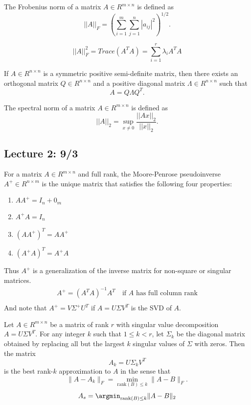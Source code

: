 \documentclass[answers,12pt,addpoints]{exam}
\begin{document}
\begin{example}
     The Frobenius norm of a matrix $A \in R^{m \times n}$ is defined as
    $$||A||_F = \left( \sum_{i=1}^{m} \sum_{j=1}^{n} |a_{ij}|^2 \right)^{1/2}.$$
    \begin{remark}
$$||A||_F^2 = Trace(A^TA) = \sum_{i=1}^{r} \lambda_i A^T A$$
    \end{remark}
\end{example}
\begin{theorem}
     If $A \in R^{n \times n}$ is a symmetric positive semi-definite matrix, then there exists an orthogonal matrix $Q \in R^{n \times n}$ and a positive diagonal matrix $\Lambda \in R^{n \times n}$ such that
    $$A = Q \Lambda Q^T.$$
\end{theorem}
\begin{definition}
    The spectral norm of a matrix $A \in R^{m \times n}$ is defined as
    $$||A||_2 = \sup_{x \neq 0} \frac{||Ax||_2}{||x||_2}.$$
\end{definition}

\subsection{Lecture 2: 9/3}
\begin{definition}
     For a matrix $A \in R^{m \times n}$ and full rank, the Moore-Penrose pseudoinverse $A^+ \in R^{n \times m}$ is the unique matrix that satisfies the following four properties:
    \begin{enumerate}
        \item $AA^+ = I_n + 0_m$
        \item $A^+A = I_n$
        \item $(AA^+)^T = AA^+$
        \item $(A^+A)^T = A^+A$
    \end{enumerate}
    Thus $A^+$ is a generalization of the inverse matrix for non-square or singular matrices.
    \begin{align*}
        A^+ = (A^TA)^{-1}A^T \quad \text{if } A \text{ has full column rank} \\
    \end{align*}
    And note that $A^+ = V \Sigma^+ U^T$ if $A = U \Sigma V^T$ is the SVD of $A$.
\end{definition}
\begin{theorem}
     Let $A \in R^{m \times n}$ be a matrix of rank $r$ with singular value decomposition $A = U \Sigma V^T$. For any integer $k$ such that $1 \leq k < r$, let $\Sigma_k$ be the diagonal matrix obtained by replacing all but the largest $k$ singular values of $\Sigma$ with zeros. Then the matrix
    $$A_k = U \Sigma_k V^T$$
    is the best rank-$k$ approximation to $A$ in the sense that
    $$\|A - A_k\|_F = \min_{\text{rank}(B) \leq k} \|A - B\|_F.$$
    $$A_s = \argmin_{\text{rank}(B) \leq k} \|A - B\|_2$$
\end{theorem}
\end{document}

